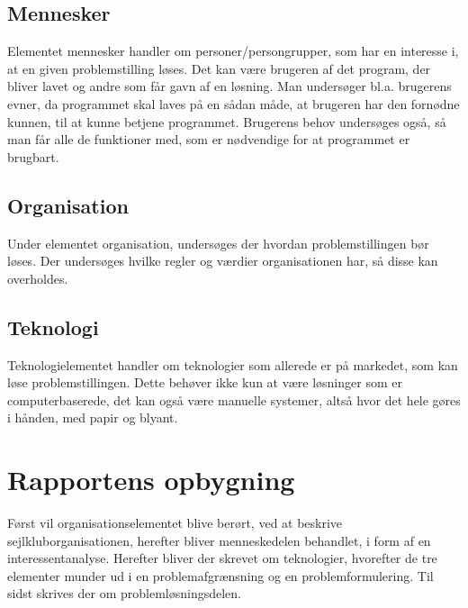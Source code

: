 \subsection{Mennesker}\label{subsec:mennesker}

Elementet mennesker handler om personer/persongrupper, som har en interesse i, at en given problemstilling
løses. Det kan være brugeren af det program, der bliver lavet og andre som får gavn af en løsning. Man
undersøger bl.a. brugerens evner, da programmet skal laves på en sådan måde, at brugeren har den
fornødne kunnen, til at kunne betjene programmet. Brugerens behov undersøges også, så man får alle de funktioner
med, som er nødvendige for at programmet er brugbart.


\subsection{Organisation}\label{subsec:organisation}

Under elementet organisation, undersøges der hvordan problemstillingen bør løses. Der undersøges hvilke regler
og værdier organisationen har, så disse kan overholdes.


\subsection{Teknologi}\label{subsec:Teknologi}

Teknologielementet handler om teknologier som allerede er på markedet, som kan løse problemstillingen. Dette
behøver ikke kun at være løsninger som er computerbaserede, det kan også være manuelle systemer, altså hvor
det hele gøres i hånden, med papir og blyant.


\section{Rapportens opbygning}\label{sec:rapportens-opbygning}

Først vil organisationselementet blive berørt, ved at beskrive sejlkluborganisationen, herefter bliver
menneskedelen behandlet, i form af en interessentanalyse. Herefter bliver der skrevet om teknologier,
hvorefter de tre elementer munder ud i en problemafgrænsning og en problemformulering. Til sidst skrives der
om problemløsningsdelen.
